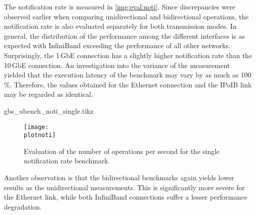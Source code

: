 The notification rate is measured in \autoref{img:eval:noti}. Since discrepancies were observed earlier when comparing unidirectional and bidirectional operations, the notification rate is also evaluated separately for both transmission modes. In general, the distribution of the performance among the different interfaces is as expected with InfiniBand exceeding the performance of all other networks. Surprisingly, the 1\,GbE connection has a slightly higher notification rate than the 10\,GbE connection. An investigation into the variance of the measurement yielded that the execution latency of the benchmark may vary by as much as 100\,\%. Therefore, the values obtained for the Ethernet connection and the \ac{IPoIB} link may be regarded as identical.


\newcommand{\plotnoti}{gbs_ubench_noti_single.tikz}
\begin{filecontents}{\plotnoti}

\datatableudir
{}\datatablebdir
{}
\end{filecontents}

\begin{figure}[htb]
\centering
\texttt{[image: \\plotnoti]}
\caption{Evaluation of the number of operations per second for the single notification rate benchmark.}
\label{img:eval:noti}
\end{figure}

Another observation is that the bidirectional benchmarks again yields lower results as the unidirectional measurements. This is significantly more severe for the Ethernet link, while both InfiniBand connections suffer a lesser performance degradation.


